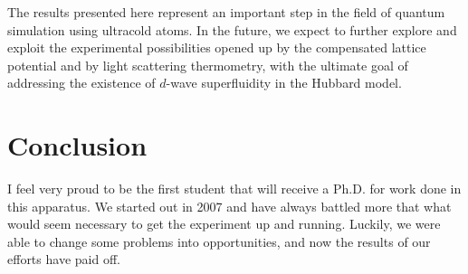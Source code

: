 \documentclass[twoside,11pt]{memoir}
\begin{document}
The results presented here represent an important step in the field of quantum
simulation using ultracold atoms.  In the future, we expect to further explore
and exploit the experimental possibilities opened up by the compensated lattice
potential and by light scattering thermometry, with the ultimate goal of
addressing the existence of $d$-wave superfluidity in the Hubbard model. 


\pagestyle{plain} %

 



\tableofcontents*  %






\mainmatter
\pagestyle{rice}


\let\oldparskip\parskip
\setlength{\parskip}{0.8em}






















\chapter{Conclusion} 

I feel very proud to be the first student that will receive a Ph.D. for work
done in this apparatus.   We started out in 2007 and have always battled more
that what would seem necessary to get the experiment up and running.  Luckily,
we  were able to change some problems into opportunities, and now the results
of our efforts have paid off.  
\end{document}
